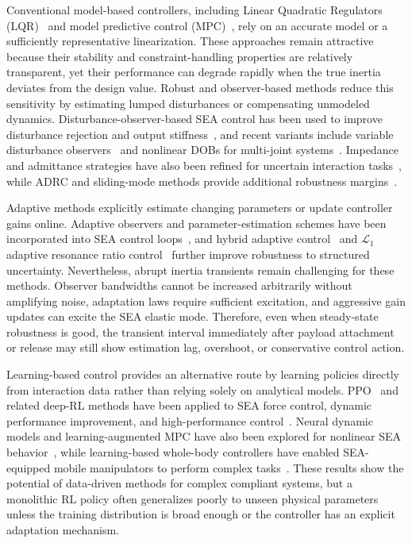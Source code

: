 \documentclass[lettersize,journal]{IEEEtran}
\begin{document}
Conventional model-based controllers, including Linear Quadratic Regulators (LQR)~\cite{sariyildiz2026Robust} and model predictive control (MPC)~\cite{zhang2024Development}, rely on an accurate model or a sufficiently representative linearization. These approaches remain attractive because their stability and constraint-handling properties are relatively transparent, yet their performance can degrade rapidly when the true inertia deviates from the design value. Robust and observer-based methods reduce this sensitivity by estimating lumped disturbances or compensating unmodeled dynamics. Disturbance-observer-based SEA control has been used to improve disturbance rejection and output stiffness~\cite{asignacion2021high, ito2024disturbance}, and recent variants include variable disturbance observers~\cite{sun2025Variablea} and nonlinear DOBs for multi-joint systems~\cite{han2021nonlinear}. Impedance and admittance strategies have also been refined for uncertain interaction tasks~\cite{lee2021hybrid, ozdemir2025adaptive, zhong2021toward}, while ADRC and sliding-mode methods provide additional robustness margins~\cite{chen2021practical, sun2021trajectory}.

Adaptive methods explicitly estimate changing parameters or update controller gains online. Adaptive observers and parameter-estimation schemes have been incorporated into SEA control loops~\cite{song2025adaptive, min2026adaptive}, and hybrid adaptive control~\cite{lanh2023Hybrid} and $\mathcal{L}_1$ adaptive resonance ratio control~\cite{min2024L1adaptive} further improve robustness to structured uncertainty. Nevertheless, abrupt inertia transients remain challenging for these methods. Observer bandwidths cannot be increased arbitrarily without amplifying noise, adaptation laws require sufficient excitation, and aggressive gain updates can excite the SEA elastic mode. Therefore, even when steady-state robustness is good, the transient interval immediately after payload attachment or release may still show estimation lag, overshoot, or conservative control action.

Learning-based control provides an alternative route by learning policies directly from interaction data rather than relying solely on analytical models. PPO~\cite{schulman2017Proximal} and related deep-RL methods have been applied to SEA force control, dynamic performance improvement, and high-performance control~\cite{sambhus2023real, lahmann2025series, xia2026high}. Neural dynamic models and learning-augmented MPC have also been explored for nonlinear SEA behavior~\cite{umurzakov2025neural, zhang2024Development}, while learning-based whole-body controllers have enabled SEA-equipped mobile manipulators to perform complex tasks~\cite{liu2021whole, ren2022integrated}. These results show the potential of data-driven methods for complex compliant systems, but a monolithic RL policy often generalizes poorly to unseen physical parameters unless the training distribution is broad enough or the controller has an explicit adaptation mechanism.
\end{document}
